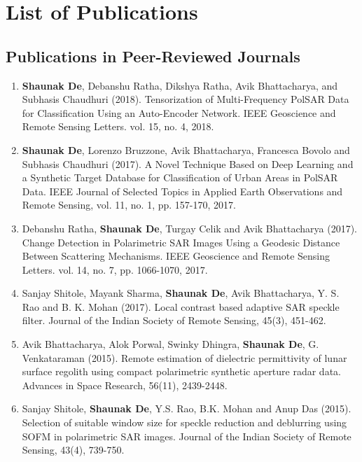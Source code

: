 
\chapter*{List of Publications}

\section*{Publications in Peer-Reviewed Journals}
{\small
\begin{enumerate} 

\item {}\quad \textbf{Shaunak De}, Debanshu Ratha, Dikshya Ratha, Avik Bhattacharya, and Subhasis Chaudhuri (2018). Tensorization of Multi-Frequency PolSAR Data for Classification Using an Auto-Encoder Network. IEEE Geoscience and Remote Sensing Letters. vol. 15, no. 4, 2018.

\item {}\quad \textbf{Shaunak De}, Lorenzo Bruzzone, Avik Bhattacharya, Francesca Bovolo and Subhasis Chaudhuri (2017). A Novel Technique Based on Deep Learning and a Synthetic Target Database for Classification of Urban Areas in PolSAR Data. IEEE Journal of Selected Topics in Applied Earth Observations and Remote Sensing, vol. 11, no. 1, pp. 157-170, 2017. 

\item {}\quad Debanshu Ratha, \textbf{Shaunak De}, Turgay Celik and Avik Bhattacharya (2017). Change Detection in Polarimetric SAR Images Using a Geodesic Distance Between Scattering Mechanisms. IEEE Geoscience and Remote Sensing Letters. vol. 14, no. 7, pp. 1066-1070, 2017. 

\item Sanjay Shitole, Mayank Sharma, \textbf{Shaunak De}, Avik Bhattacharya, Y. S. Rao and B. K. Mohan (2017). Local contrast based adaptive SAR speckle filter. Journal of the Indian Society of Remote Sensing, 45(3), 451-462.

\item Avik Bhattacharya, Alok Porwal, Swinky Dhingra, \textbf{Shaunak De}, G. Venkataraman (2015). Remote estimation of dielectric permittivity of lunar surface regolith using compact polarimetric synthetic aperture radar data. Advances in Space Research, 56(11), 2439-2448.

\item Sanjay Shitole, \textbf{Shaunak De}, Y.S. Rao, B.K. Mohan and Anup Das (2015). Selection of suitable window size for speckle reduction and deblurring using SOFM in polarimetric SAR images. Journal of the Indian Society of Remote Sensing, 43(4), 739-750.


\end{enumerate}}
